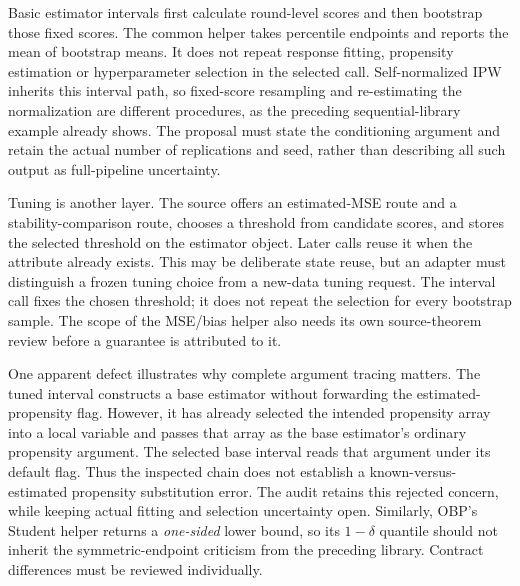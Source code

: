 Basic estimator intervals first calculate round-level scores and then bootstrap
those fixed scores. The common helper takes percentile endpoints and reports
the mean of bootstrap means. It does not repeat response fitting, propensity
estimation or hyperparameter selection in the selected call. Self-normalized
IPW inherits this interval path, so fixed-score resampling and re-estimating the
normalization are different procedures, as the preceding sequential-library
example already shows. The proposal must state the conditioning argument and
retain the actual number of replications and seed, rather than describing all
such output as full-pipeline uncertainty.
\cite{exec23_obp_sources}

Tuning is another layer. The source offers an estimated-MSE route and a
stability-comparison route, chooses a threshold from candidate scores, and
stores the selected threshold on the estimator object. Later calls reuse it
when the attribute already exists. This may be deliberate state reuse, but an
adapter must distinguish a frozen tuning choice from a new-data tuning request.
The interval call fixes the chosen threshold; it does not repeat the selection
for every bootstrap sample. The scope of the MSE/bias helper also needs its own
source-theorem review before a guarantee is attributed to it.
\cite{exec23_obp_sources}

One apparent defect illustrates why complete argument tracing matters. The
tuned interval constructs a base estimator without forwarding the estimated-
propensity flag. However, it has already selected the intended propensity
array into a local variable and passes that array as the base estimator's
ordinary propensity argument. The selected base interval reads that argument
under its default flag. Thus the inspected chain does not establish a
known-versus-estimated propensity substitution error. The audit retains this
rejected concern, while keeping actual fitting and selection uncertainty open.
Similarly, OBP's Student helper returns a \emph{one-sided} lower bound, so its
$1-\delta$ quantile should not inherit the symmetric-endpoint criticism from
the preceding library. Contract differences must be reviewed individually.
\cite{exec23_obp_sources,exec23_obp_reference}

